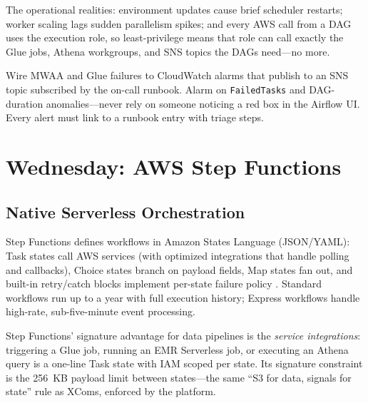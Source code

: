 The operational realities: environment updates cause brief scheduler restarts; worker scaling lags sudden parallelism spikes; and every AWS call from a DAG uses the execution role, so least-privilege means that role can call exactly the Glue jobs, Athena workgroups, and SNS topics the DAGs need---no more.

\begin{tipbox}
Wire MWAA and Glue failures to CloudWatch alarms that publish to an SNS topic subscribed by the on-call runbook. Alarm on \texttt{FailedTasks} and DAG-duration anomalies---never rely on someone noticing a red box in the Airflow UI. Every alert must link to a runbook entry with triage steps.
\end{tipbox}

\section{Wednesday: AWS Step Functions}
\subsection{Native Serverless Orchestration}
Step Functions defines workflows in Amazon States Language (JSON/YAML): Task states call AWS services (with optimized integrations that handle polling and callbacks), Choice states branch on payload fields, Map states fan out, and built-in retry/catch blocks implement per-state failure policy \cite{awsStepFunctionsDocs}. Standard workflows run up to a year with full execution history; Express workflows handle high-rate, sub-five-minute event processing.

Step Functions' signature advantage for data pipelines is the \emph{service integrations}: triggering a Glue job, running an EMR Serverless job, or executing an Athena query is a one-line Task state with IAM scoped per state. Its signature constraint is the 256~KB payload limit between states---the same ``S3 for data, signals for state'' rule as XComs, enforced by the platform.

